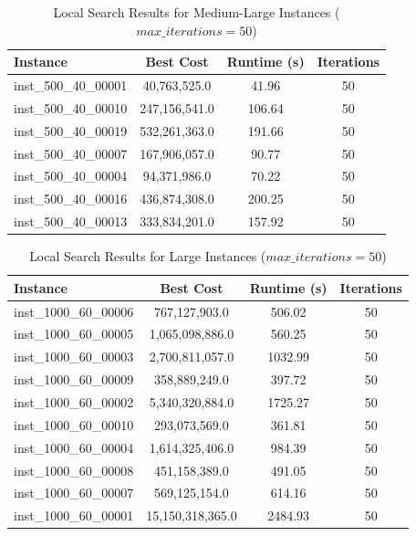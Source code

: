\documentclass{article}
\begin{document}
\begin{table}[H]
\centering
\caption{Local Search Results for Medium-Large Instances ($max\_iterations = 50$)}
\begin{tabular}{lccc}
\toprule
\textbf{Instance} & \textbf{Best Cost} & \textbf{Runtime (s)} & \textbf{Iterations} \\
\midrule
inst\_500\_40\_00001 & 40,763,525.0   & 41.96  & 50 \\
inst\_500\_40\_00010 & 247,156,541.0  & 106.64 & 50 \\
inst\_500\_40\_00019 & 532,261,363.0  & 191.66 & 50 \\
inst\_500\_40\_00007 & 167,906,057.0  & 90.77  & 50 \\
inst\_500\_40\_00004 & 94,371,986.0   & 70.22  & 50 \\
inst\_500\_40\_00016 & 436,874,308.0  & 200.25 & 50 \\
inst\_500\_40\_00013 & 333,834,201.0  & 157.92 & 50 \\
\bottomrule
\end{tabular}
\label{tab:large_instance_results}
\end{table}

\begin{table}[H]
\centering
\caption{Local Search Results for Large Instances ($max\_iterations = 50$)}
\begin{tabular}{lccc}
\toprule
\textbf{Instance} & \textbf{Best Cost} & \textbf{Runtime (s)} & \textbf{Iterations} \\
\midrule
inst\_1000\_60\_00006 & 767,127,903.0  & 506.02  & 50 \\
inst\_1000\_60\_00005 & 1,065,098,886.0 & 560.25  & 50 \\
inst\_1000\_60\_00003 & 2,700,811,057.0 & 1032.99 & 50 \\
inst\_1000\_60\_00009 & 358,889,249.0   & 397.72  & 50 \\
inst\_1000\_60\_00002 & 5,340,320,884.0 & 1725.27 & 50 \\
inst\_1000\_60\_00010 & 293,073,569.0   & 361.81  & 50 \\
inst\_1000\_60\_00004 & 1,614,325,406.0   & 984.39  & 50 \\
inst\_1000\_60\_00008 & 451,158,389.0   & 491.05  & 50 \\
inst\_1000\_60\_00007 & 569,125,154.0   & 614.16  & 50 \\
inst\_1000\_60\_00001 & 15,150,318,365.0  & 2484.93 & 50 \\
\bottomrule
\end{tabular}
\label{tab:local_search_results}
\end{table}
\end{document}
